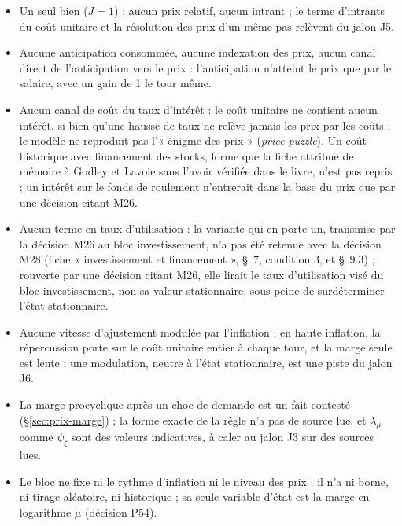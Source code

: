 \documentclass[11pt,a4paper]{article}
\begin{document}
\begin{portee}[prix]
\begin{itemize}
\item Un seul bien ($J = 1$) : aucun prix relatif, aucun intrant ; le terme d'intrants du coût unitaire et la résolution des prix d'un même pas relèvent du jalon J5.
\item Aucune anticipation consommée, aucune indexation des prix, aucun canal direct de l'anticipation vers le prix : l'anticipation n'atteint le prix que par le salaire, avec un gain de 1 le tour même.
\item Aucun canal de coût du taux d'intérêt : le coût unitaire ne contient aucun intérêt, si bien qu'une hausse de taux ne relève jamais les prix par les coûts ; le modèle ne reproduit pas l'« énigme des prix » (\emph{price puzzle}). Un coût historique avec financement des stocks, forme que la fiche attribue de mémoire à Godley et Lavoie sans l'avoir vérifiée dans le livre, n'est pas repris ; un intérêt sur le fonds de roulement n'entrerait dans la base du prix que par une décision citant M26.
\item Aucun terme en taux d'utilisation : la variante qui en porte un, transmise par la décision M26 au bloc investissement, n'a pas été retenue avec la décision M28 (fiche « investissement et financement », \S~7, condition 3, et \S~9.3) ; rouverte par une décision citant M26, elle lirait le taux d'utilisation visé du bloc investissement, non sa valeur stationnaire, sous peine de surdéterminer l'état stationnaire.
\item Aucune vitesse d'ajustement modulée par l'inflation : en haute inflation, la répercussion porte sur le coût unitaire entier à chaque tour, et la marge seule est lente ; une modulation, neutre à l'état stationnaire, est une piste du jalon J6.
\item La marge procyclique après un choc de demande est un fait contesté (\S\ref{sec:prix-marge}) ; la forme exacte de la règle n'a pas de source lue, et $\lambda_\mu$ comme $\psi_\xi$ sont des valeurs indicatives, à caler au jalon J3 sur des sources lues.
\item Le bloc ne fixe ni le rythme d'inflation ni le niveau des prix ; il n'a ni borne, ni tirage aléatoire, ni historique ; sa seule variable d'état est la marge en logarithme $\tilde\mu$ (décision P54).
\end{itemize}
\end{portee}

\end{document}
